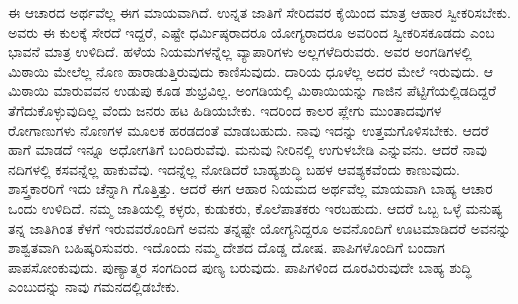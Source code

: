 ಈ ಆಚಾರದ ಅರ್ಥವೆಲ್ಲ ಈಗ ಮಾಯವಾಗಿದೆ. ಉನ್ನತ ಜಾತಿಗೆ ಸೇರಿದವರ ಕೈಯಿಂದ ಮಾತ್ರ ಆಹಾರ ಸ್ವೀಕರಿಸಬೇಕು. ಅವರು ಈ ಕುಲಕ್ಕೆ ಸೇರದೆ ಇದ್ದರೆ, ಎಷ್ಟೇ ಧರ್ಮಿಷ್ಠರಾದರೂ ಯೋಗ್ಯರಾದರೂ ಅವರಿಂದ ಸ್ವೀಕರಿಸಕೂಡದು ಎಂಬ ಭಾವನೆ ಮಾತ್ರ ಉಳಿದಿದೆ. ಹಳೆಯ ನಿಯಮಗಳನ್ನೆಲ್ಲ ವ್ಯಾಪಾರಿಗಳು ಅಲ್ಲಗಳೆದಿರುವರು. ಅವರ ಅಂಗಡಿಗಳಲ್ಲಿ ಮಿಠಾಯಿ ಮೇಲೆಲ್ಲ ನೊಣ ಹಾರಾಡುತ್ತಿರುವುದು ಕಾಣಿಸುವುದು. ದಾರಿಯ ಧೂಳೆಲ್ಲ ಅದರ ಮೇಲೆ ಇರುವುದು. ಆ ಮಿಠಾಯಿ ಮಾರುವವನ ಉಡುಪು ಕೂಡ ಶುಭ್ರವಿಲ್ಲ. ಅಂಗಡಿಯಲ್ಲಿ ಮಿಠಾಯಿಯನ್ನು ಗಾಜಿನ ಪೆಟ್ಟಿಗೆಯಲ್ಲಿಡದಿದ್ದರೆ ತೆಗೆದುಕೊಳ್ಳುವುದಿಲ್ಲ ವೆಂದು ಜನರು ಹಟ ಹಿಡಿಯಬೇಕು. ಇದರಿಂದ ಕಾಲರ ಪ್ಲೇಗು ಮುಂತಾದವುಗಳ ರೋಗಾಣುಗಳು ನೊಣಗಳ ಮೂಲಕ ಹರಡದಂತೆ ಮಾಡಬಹುದು. ನಾವು ಇದನ್ನು ಉತ್ತಮಗೊಳಿಸಬೇಕು. ಆದರೆ ಹಾಗೆ ಮಾಡದೆ ಇನ್ನೂ ಅಧೋಗತಿಗೆ ಬಂದಿರುವೆವು. ಮನುವು ನೀರಿನಲ್ಲಿ ಉಗುಳಬೇಡಿ ಎನ್ನುವನು. ಆದರೆ ನಾವು ನದಿಗಳಲ್ಲಿ ಕಸವನ್ನೆಲ್ಲ ಹಾಕುವೆವು. ಇದನ್ನೆಲ್ಲ ನೋಡಿದರೆ ಬಾಹ್ಯಶುದ್ಧಿ ಬಹಳ ಆವಶ್ಯಕವೆಂದು ಕಾಣುವುದು. ಶಾಸ್ತ್ರಕಾರರಿಗೆ ಇದು ಚೆನ್ನಾಗಿ ಗೊತ್ತಿತ್ತು. ಆದರೆ ಈಗ ಆಹಾರ ನಿಯಮದ ಅರ್ಥವೆಲ್ಲ ಮಾಯವಾಗಿ ಬಾಹ್ಯ ಆಚಾರ ಒಂದು ಉಳಿದಿದೆ. ನಮ್ಮ ಜಾತಿಯಲ್ಲಿ ಕಳ್ಳರು, ಕುಡುಕರು, ಕೊಲೆಪಾತಕರು ಇರಬಹುದು. ಆದರೆ ಒಬ್ಬ ಒಳ್ಳೆ ಮನುಷ್ಯ ತನ್ನ ಜಾತಿಗಿಂತ ಕೆಳಗೆ ಇರುವವರೊಂದಿಗೆ ಅವನು ತನ್ನಷ್ಟೇ ಯೋಗ್ಯನಿದ್ದರೂ ಅವನೊಂದಿಗೆ ಊಟಮಾಡಿದರೆ ಅವನನ್ನು ಶಾಶ್ವತವಾಗಿ ಬಹಿಷ್ಕರಿಸುವರು. ಇದೊಂದು ನಮ್ಮ ದೇಶದ ದೊಡ್ಡ ದೋಷ. ಪಾಪಿಗಳೊಂದಿಗೆ ಬಂದಾಗ ಪಾಪಸೋಂಕುವುದು. ಪುಣ್ಯಾತ್ಮರ ಸಂಗದಿಂದ ಪುಣ್ಯ ಬರುವುದು. ಪಾಪಿಗಳಿಂದ ದೂರವಿರುವುದೇ ಬಾಹ್ಯ ಶುದ್ಧಿ ಎಂಬುದನ್ನು ನಾವು ಗಮನದಲ್ಲಿಡಬೇಕು.

